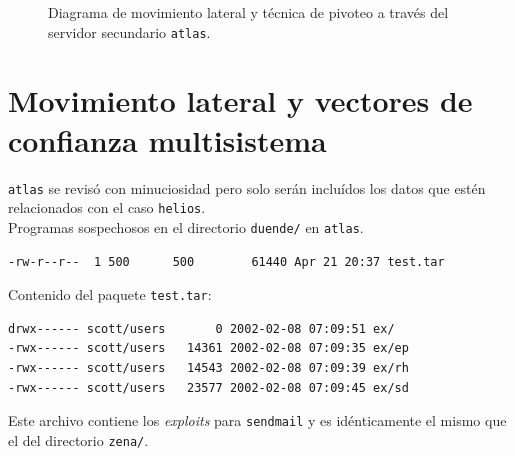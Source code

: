 \begin{figure}[htbp]
\caption{Diagrama de movimiento lateral y técnica de pivoteo a través del servidor secundario \texttt{atlas}.}
\label{fig:pivoteo_multisistema}
\end{figure}

\section{Movimiento lateral y vectores de confianza multisistema}


 \texttt{atlas} se revisó con minuciosidad pero solo serán incluídos los datos
 que estén relacionados con el caso \texttt{helios}.\\


 Programas sospechosos en el directorio \texttt{duende/} en \texttt{atlas}.
 
\vspace{1em}

\begin{lstlisting}[style=terminal]
-rw-r--r--  1 500      500        61440 Apr 21 20:37 test.tar
\end{lstlisting}

\vspace{1em}

Contenido del paquete \texttt{test.tar}:

\vspace{1em}

\begin{lstlisting}[style=terminal] 
drwx------ scott/users       0 2002-02-08 07:09:51 ex/
-rwx------ scott/users   14361 2002-02-08 07:09:35 ex/ep
-rwx------ scott/users   14543 2002-02-08 07:09:39 ex/rh
-rwx------ scott/users   23577 2002-02-08 07:09:45 ex/sd
\end{lstlisting}

\vspace{1em}

 Este archivo contiene los \textit{exploits} para \texttt{sendmail} y es idénticamente el
 mismo que el del directorio \texttt{zena/}.
 
